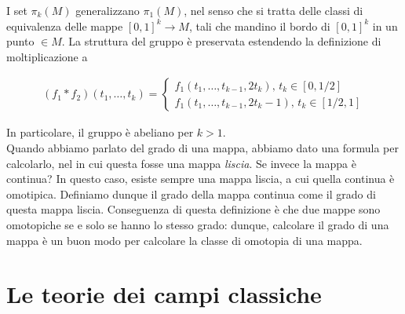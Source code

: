 \documentclass{report}
\begin{document}
I set \(\pi_k(M)\) generalizzano \(\pi_1(M)\), nel senso che si tratta delle classi di equivalenza delle mappe \([0, 1]^k \rightarrow M\), tali che mandino il bordo di \([0, 1]^k\) in un punto \(\in M\). La struttura del gruppo è preservata estendendo la definizione di moltiplicazione a 

\begin{align}
    (f_1 * f_2)(t_1, \ldots, t_k) = \begin{cases}
        f_1(t_1, \ldots, t_{k-1}, 2t_k), \, t_k \in [0, 1/2] \\
        f_1(t_1, \ldots, t_{k-1}, 2t_k - 1), \, t_k \in [1/2, 1]
    \end{cases} 
\end{align}


In particolare, il gruppo è abeliano per \(k>1\). \\

Quando abbiamo parlato del grado di una mappa, abbiamo dato una formula per calcolarlo, nel in cui questa fosse una mappa \emph{liscia}. Se invece la mappa è continua? In questo caso, esiste sempre una mappa liscia, a cui quella continua è omotipica. Definiamo dunque il grado della mappa continua come il grado di questa mappa liscia. Conseguenza di questa definizione è che due mappe sono omotopiche se e solo se hanno lo stesso grado: dunque, calcolare il grado di una mappa è un buon modo per calcolare la classe di omotopia di una mappa. 













































\section{Le teorie dei campi classiche}
\end{document}
